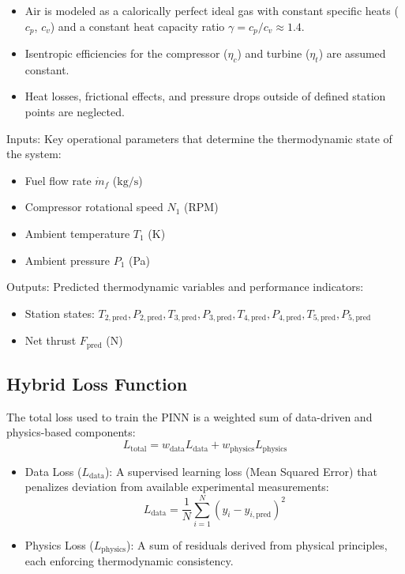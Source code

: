 \documentclass[
  12pt,
  oneside,
  a4paper,
  english,
  brazil]{abntex2}
\begin{document}
\begin{itemize}
    \item Air is modeled as a calorically perfect ideal gas with constant specific heats ($c_p$, $c_v$) and a constant heat capacity ratio $\gamma = c_p / c_v \approx 1.4$.
    \item Isentropic efficiencies for the compressor ($\eta_c$) and turbine ($\eta_t$) are assumed constant.
    \item Heat losses, frictional effects, and pressure drops outside of defined station points are neglected.
\end{itemize}

Inputs: Key operational parameters that determine the thermodynamic
state of the system:

\begin{itemize}
    \item Fuel flow rate $\dot{m}_f$ ($\mathrm{kg/s}$)
    \item Compressor rotational speed $N_1$ (RPM)
    \item Ambient temperature $T_1$ (K)
    \item Ambient pressure $P_1$ (Pa)
\end{itemize}

Outputs: Predicted thermodynamic variables and performance indicators:

\begin{itemize}
    \item Station states: $T_{2,\text{pred}}, P_{2,\text{pred}}, T_{3,\text{pred}}, P_{3,\text{pred}}, T_{4,\text{pred}}, P_{4,\text{pred}}, T_{5,\text{pred}}, P_{5,\text{pred}}$
    \item Net thrust $F_{\text{pred}}$ (N)
\end{itemize}

\subsection{Hybrid Loss Function}\label{hybrid-loss-function}

The total loss used to train the PINN is a weighted sum of data-driven
and physics-based components: \[
L_{\text{total}} = w_{\text{data}} L_{\text{data}} + w_{\text{physics}} L_{\text{physics}}
\]

\begin{itemize}
    \item Data Loss ($L_{\text{data}}$): A supervised learning loss (Mean Squared Error) that penalizes deviation from available experimental measurements:
$$
    L_{\text{data}} = \frac{1}{N} \sum_{i=1}^{N} \left( y_i - y_{i,\text{pred}} \right)^2
$$
    
    \item Physics Loss ($L_{\text{physics}}$): A sum of residuals derived from physical principles, each enforcing thermodynamic consistency.
\end{itemize}
\end{document}
